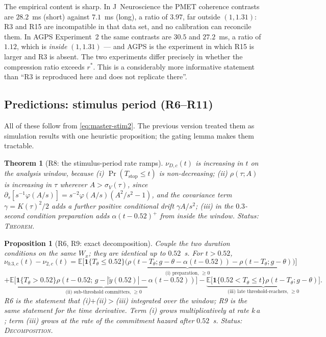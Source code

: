 \documentclass[11pt,a4paper]{article}
\newcommand{\E}{\mathbb{E}}
\newcommand{\Tstop}{T_{\text{stop}}}
\theoremstyle{plain}
\newtheorem{proposition}{Proposition}
\newtheorem{theorem}{Theorem}
\theoremstyle{remark}
\begin{document}
The empirical content is sharp. In J~Neuroscience the PMET coherence contrasts are
$28.2$~ms (short) against $7.1$~ms (long), a ratio of $3.97$, far outside $(1,1.31)$: R3
and R15 are incompatible in that data set, and no calibration can reconcile them. In AGPS
Experiment~2 the same contrasts are $30.5$ and $27.2$~ms, a ratio of $1.12$, which is
\emph{inside} $(1,1.31)$ --- and AGPS is the experiment in which R15 is larger and R3 is
absent. The two experiments differ precisely in whether the compression ratio exceeds
$r^{*}$. This is a considerably more informative statement than ``R3 is reproduced here
and does not replicate there''.

\subsection{Predictions: stimulus period (R6--R11)}
\label{sec:stimpred}

All of these follow from \eqref{eq:master-stim2}. The previous version treated them as
simulation results with one heuristic proposition; the gating lemma makes them tractable.

\begin{theorem}[R8: the stimulus-period rate ramps]
\label{thm:R8}
$\nu_{D,c}(t)$ is increasing in $t$ on the analysis window, because
(i) $\Pr(\Tstop\le t)$ is non-decreasing;
(ii) $\rho(\tau;A)$ is increasing in $\tau$ wherever $A>\sigma_V(\tau)$, since
$\partial_s[s^{-1}\varphi(A/s)]=s^{-2}\varphi(A/s)(A^2/s^2-1)$, and the covariance term
$\gamma=K(\tau)^2/2$ adds a further positive conditional drift $\gamma A/s^2$;
(iii) in the $0.3$-second condition preparation adds $\alpha(t-0.52)^{+}$ from inside the
window. \emph{Status: \textsc{Theorem}.}
\end{theorem}

\begin{proposition}[R6, R9: exact decomposition]
\label{prop:R69}
Couple the two duration conditions on the same $W_x$; they are identical up to $0.52$~s.
For $t>0.52$,
\begin{equation}
\nu_{0.3,c}(t)-\nu_{2,c}(t)=\underbrace{\E\bigl[\mathbf 1\{T_\theta\le0.52\}
\bigl(\rho(t-T_\theta;g-\theta-\alpha(t-0.52))-\rho(t-T_\theta;g-\theta)\bigr)\bigr]}_{\text{(i) preparation, }\ge0}
\end{equation}
\begin{equation}
+\underbrace{\E\bigl[\mathbf 1\{T_\theta>0.52\}\rho(t-0.52;\,g-|\tilde y(0.52)|-\alpha(t-0.52))\bigr]}_{\text{(ii) sub-threshold committers, }\ge0}
-\underbrace{\E\bigl[\mathbf 1\{0.52<T_\theta\le t\}\rho(t-T_\theta;g-\theta)\bigr]}_{\text{(iii) late threshold-reachers, }\ge0}.
\end{equation}
R6 is the statement that (i)$+$(ii)$>$(iii) integrated over the window; R9 is the same
statement for the time derivative. Term (i) grows multiplicatively at rate $k\,a$; term
(iii) grows at the rate of the commitment hazard after $0.52$~s.
\emph{Status: \textsc{Decomposition}.}
\end{proposition}
\end{document}
